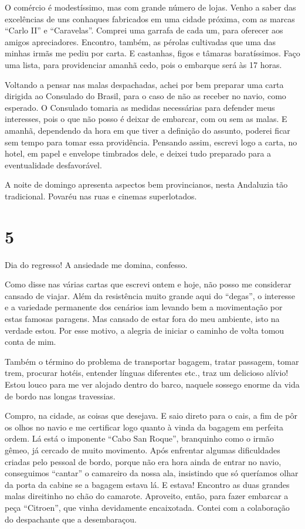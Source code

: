 O comércio é modestíssimo, mas com grande número de lojas. Venho a saber das excelências de uns conhaques fabricados em uma cidade próxima, com as marcas “Carlo II” e “Caravelas”. Comprei uma garrafa de cada um, para oferecer aos amigos apreciadores. Encontro, também, as pérolas cultivadas que uma das minhas irmãs me pediu por carta. E castanhas, figos e tâmaras baratíssimos. Faço uma lista, para providenciar amanhã cedo, pois o embarque será às 17 horas.

Voltando a pensar nas malas despachadas, achei por bem preparar uma carta dirigida ao Consulado do Brasil, para o caso de não as receber no navio, como esperado. O Consulado tomaria as medidas necessárias para defender meus interesses, pois o que não posso é deixar de embarcar, com ou sem as malas. E amanhã, dependendo da hora em que tiver a definição do assunto, poderei ficar sem tempo para tomar essa providência. Pensando assim, escrevi logo a carta, no hotel, em papel e envelope timbrados dele, e deixei tudo preparado para a eventualidade desfavorável.

A noite de domingo apresenta aspectos bem provincianos, nesta Andaluzia tão tradicional. Povaréu nas ruas e cinemas superlotados.

\section*{5 \adfflatleafright {}}
Dia do regresso! A ansiedade me domina, confesso.

Como disse nas várias cartas que escrevi ontem e hoje, não posso me considerar cansado de viajar. Além da resistência muito grande aqui do “degas”, o interesse e a variedade permanente dos cenários iam levando bem a movimentação por estas famosas paragens. Mas cansado de estar fora do meu ambiente, isto na verdade estou. Por esse motivo, a alegria de iniciar o caminho de volta tomou conta de mim.

Também o término do problema de transportar bagagem, tratar passagem, tomar trem, procurar hotéis, entender línguas diferentes etc., traz um delicioso alívio! Estou louco para me ver alojado dentro do barco, naquele sossego enorme da vida de bordo nas longas travessias.

Compro, na cidade, as coisas que desejava. E saio direto para o cais, a fim de pôr os olhos no navio e me certificar logo quanto à vinda da bagagem em perfeita ordem. Lá está o imponente “Cabo San Roque”, branquinho como o irmão gêmeo, já cercado de muito movimento. Após enfrentar algumas dificuldades criadas pelo pessoal de bordo, porque não era hora ainda de entrar no navio, conseguimos “cantar” o camareiro da nossa ala, insistindo que só queríamos olhar da porta da cabine se a bagagem estava lá. E estava! Encontro as duas grandes malas direitinho no chão do camarote. Aproveito, então, para fazer embarcar a peça “Citroen”, que vinha devidamente encaixotada. Contei com a colaboração do despachante que a desembaraçou.

